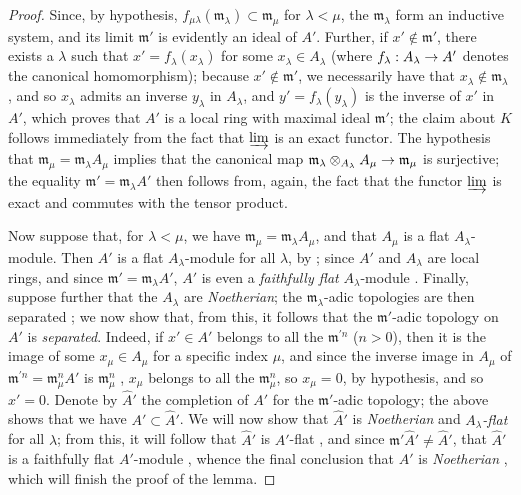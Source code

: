 \documentclass[oneside]{amsart}
\theoremstyle{ega-env-style}
\theoremstyle{ega-thm-env-style}
\theoremstyle{ega-defn-env-style}
\renewcommand{\to}{\mathchoice{\longrightarrow}{\rightarrow}{\rightarrow}{\rightarrow}}
\newcommand{\oldpage}[2][]{{\marginnote{\normalfont{\textbf{#1}~|~#2}}}\ignorespaces}
\begin{document}
\begin{proof}
Since, by hypothesis, $f_{\mu\lambda}(\mathfrak{m}_\lambda)\subset\mathfrak{m}_\mu$ for $\lambda<\mu$, the $\mathfrak{m}_\lambda$ form an inductive system, and its limit $\mathfrak{m}'$ is evidently an ideal of $A'$.
Further, if $x'\not\in\mathfrak{m}'$, there exists a $\lambda$ such that $x'=f_\lambda(x_\lambda)$ for some $x_\lambda\in A_\lambda$ (where $f_\lambda:A_\lambda\to A'$ denotes the canonical homomorphism);
because $x'\not\in\mathfrak{m}'$, we necessarily have that $x_\lambda\not\in\mathfrak{m}_\lambda$, and so $x_\lambda$ admits an inverse $y_\lambda$ in $A_\lambda$, and $y'=f_\lambda(y_\lambda)$ is the inverse of $x'$ in $A'$, which proves that $A'$ is a local ring with maximal ideal $\mathfrak{m}'$;
the claim about $K$ follows immediately from the fact that $\varinjlim$ is an exact functor.
The hypothesis that $\mathfrak{m}_\mu=\mathfrak{m}_\lambda A_\mu$ implies that the canonical map $\mathfrak{m}_\lambda\otimes_{A_\lambda}A_\mu\to\mathfrak{m}_\mu$ is surjective;
the equality $\mathfrak{m}'=\mathfrak{m}_\lambda A'$ then follows from, again, the fact that the functor $\varinjlim$ is exact and commutes with the tensor product.

Now suppose that, for $\lambda<\mu$, we have $\mathfrak{m}_\mu=\mathfrak{m}_\lambda A_\mu$, and that $A_\mu$ is a flat $A_\lambda$-module.
Then $A'$ is a flat $A_\lambda$-module for all $\lambda$, by ;
since $A'$ and $A_\lambda$ are local rings, and since $\mathfrak{m}'=\mathfrak{m}_\lambda A'$, $A'$ is even a \emph{faithfully flat} $A_\lambda$-module .
Finally, suppose further that the $A_\lambda$ are \emph{Noetherian};
the $\mathfrak{m}_\lambda$-adic topologies are then separated ;
we now show that, from this, it follows that the $\mathfrak{m}'$-adic topology on $A'$ is \emph{separated}.
Indeed, if $x'\in A'$ belongs to all the $\mathfrak{m}^{'n}$ ($n>0$), then it is the image of some $x_\mu\in A_\mu$ for a specific index $\mu$, and since the inverse image in $A_\mu$ of $\mathfrak{m}^{'n}=\mathfrak{m}_\mu^n A'$ is $\mathfrak{m}_\mu^n$ , $x_\mu$ belongs to all the $\mathfrak{m}_\mu^n$, so $x_\mu=0$, by hypothesis, and so $x'=0$.
Denote by $\widehat{A}'$ the completion of $A'$ for the $\mathfrak{m}'$-adic topology;
the above shows that we have $A'\subset\widehat{A}'$.
We will now show that $\widehat{A}'$ is \emph{Noetherian} and \emph{$A_\lambda$-flat} for all $\lambda$;
from this,
\oldpage[0\textsubscript{III-1}]{22}
it will follow that $\widehat{A}'$ is $A'$-flat , and since $\mathfrak{m}'\widehat{A}'\neq\widehat{A}'$, that $\widehat{A}'$ is a faithfully flat $A'$-module , whence the final conclusion that $A'$ is \emph{Noetherian} , which will finish the proof of the lemma.


\end{proof}
\end{document}
